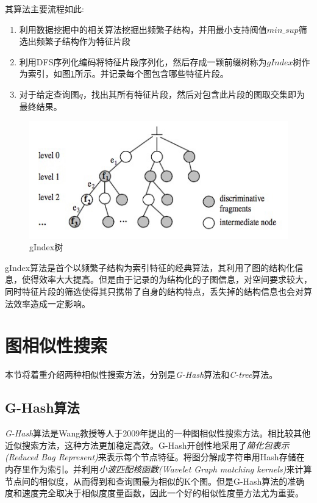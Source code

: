\documentclass{XDBAthesis}
\begin{document}
其算法主要流程如此:
\begin{enumerate}
    \item 利用数据挖掘中的相关算法挖掘出频繁子结构，并用最小支持阀值$min\_sup$筛选出频繁子结构作为特征片段
    \item 利用DFS序列化编码将特征片段序列化，然后存成一颗前缀树称为$gIndex$树作为索引，如图\ref{fg:gIndex}所示。并记录每个图包含哪些特征片段。
    \item 对于给定查询图$q$，找出其所有特征片段，然后对包含此片段的图取交集即为最终结果。
\end{enumerate}
\begin{figure}[htb]
    \centering
    \includegraphics[width=\textwidth ]{../figures/gIndex}
    \caption{gIndex树}
    \label{fg:gIndex}
\end{figure}

gIndex算法是首个以频繁子结构为索引特征的经典算法，其利用了图的结构化信息，使得效率大大提高。但是由于记录的为结构化的子图信息，对空间要求较大，同时特征片段的筛选使得其只携带了自身的结构特点，丢失掉的结构信息也会对算法效率造成一定影响。

\section{图相似性搜索}
本节将着重介绍两种相似性搜索方法，分别是\emph{G-Hash}算法\cite{ghash}和\emph{C-tree}算法\cite{C-Tree}。
\subsection{G-Hash算法}
\emph{G-Hash}算法是Wang教授等人于2009年提出的一种图相似性搜索方法。相比较其他近似搜索方法，这种方法更加稳定高效。G-Hash开创性地采用了\emph{简化包表示(Reduced Bag Represent)}来表示每个节点特征。将图分解成字符串用Hash存储在内存里作为索引。并利用\emph{小波匹配核函数(Wavelet Graph matching kernels)}来计算节点间的相似度，从而得到和查询图最为相似的K个图。但是G-Hash算法的准确度和速度完全取决于相似度度量函数，因此一个好的相似性度量方法尤为重要。
\end{document}

